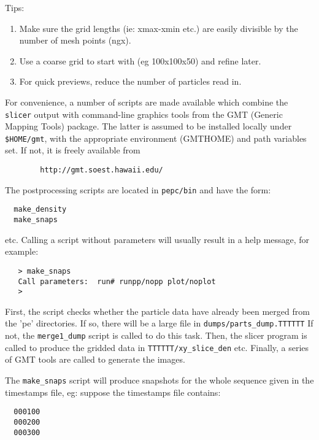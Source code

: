 \documentclass[11pt,psfig]{article}
\newcommand{\meno}{{\medskip\noindent}}
\begin{document}
\noindent 
Tips:
\begin{enumerate}
\item      Make sure the grid lengths (ie: xmax-xmin etc.) are easily
 divisible by the number of mesh points (ngx).
\item     Use a coarse grid to start with (eg 100x100x50) and refine later.
\item    For quick previews, reduce the number of particles read in.
\end{enumerate}

\noindent
For convenience, a number of scripts are made available which combine the
\texttt{slicer} output with command-line graphics tools from the GMT (Generic Mapping
Tools) package. The latter is assumed to be installed locally under
\texttt{\$HOME/gmt}, with the appropriate environment (GMTHOME) and
path variables set. If not, it is freely available from

\begin{verbatim}
        http://gmt.soest.hawaii.edu/
\end{verbatim}

The postprocessing scripts are located in \texttt{pepc/bin} and have the form:

\begin{verbatim}
  make_density 
  make_snaps
\end{verbatim}

\noindent 
etc.  Calling a script without parameters will usually result in a
help message, for example:

\begin{verbatim}
   > make_snaps
   Call parameters:  run# runpp/nopp plot/noplot
   >
\end{verbatim}

\noindent
First, the script checks whether the particle data have already been merged from
the 'pe' directories.  If so, there will be a large file in \texttt{dumps/parts_dump.TTTTTT}
If not, the \texttt{merge1_dump} script is called to do this task.  Then, the slicer program
is called to produce the gridded data in \texttt{TTTTTT/xy_slice_den} etc.
Finally, a series of GMT tools are called to generate the images.

\meno
The \texttt{make_snaps} script will produce snapshots for the whole sequence
given in the timestamps file, eg: suppose the timestamps file contains:

\begin{verbatim}
  000100
  000200
  000300
\end{verbatim}
\end{document}
